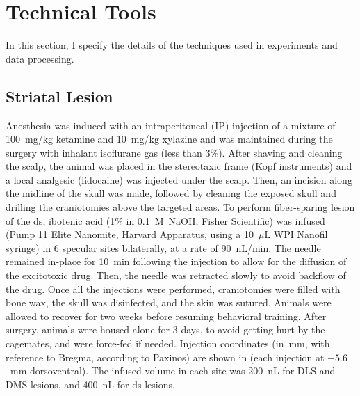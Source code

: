 \section{Technical Tools} \label{ch:methods:tech}
In this section, I specify the details of the techniques used in experiments and data processing.
\subsection{Striatal Lesion} \label{ch:method:lesion}

Anesthesia was induced with an intraperitoneal (IP) injection of a mixture of 100~mg/kg ketamine and 10~mg/kg xylazine and was maintained during the surgery with inhalant isoflurane gas (less than 3\%).
After shaving and cleaning the scalp, the animal was placed in the stereotaxic frame (Kopf instruments) and a local analgesic (lidocaine) was injected under the scalp.
Then, an incision along the midline of the skull was made, followed by cleaning the exposed skull and drilling the craniotomies above the targeted areas.
To perform fiber-sparing lesion of the \gls{ds}, ibotenic acid (1\% in 0.1~M~NaOH, Fisher Scientific) was infused (Pump 11 Elite Nanomite, Harvard Apparatus, using a 10~$\mu$L WPI Nanofil syringe) in 6 specular sites bilaterally, at a rate of 90~nL/min.
The needle remained in-place for 10~min following the injection to allow for the diffusion of the excitotoxic drug.
Then, the needle was retracted slowly to avoid backflow of the drug.
Once all the injections were performed, craniotomies were filled with bone wax, the skull was disinfected, and the skin was sutured.
Animals were allowed to recover for two weeks before resuming behavioral training.
After surgery, animals were housed alone for 3 days, to avoid getting hurt by the cagemates, and were force-fed if needed.
Injection coordinates (in~mm, with reference to Bregma, according to Paxinos) are shown in  (each injection at $-5.6$~mm dorsoventral).
The infused volume in each site was 200~nL for DLS and DMS lesions, and 400~nL for \gls{ds} lesions.

